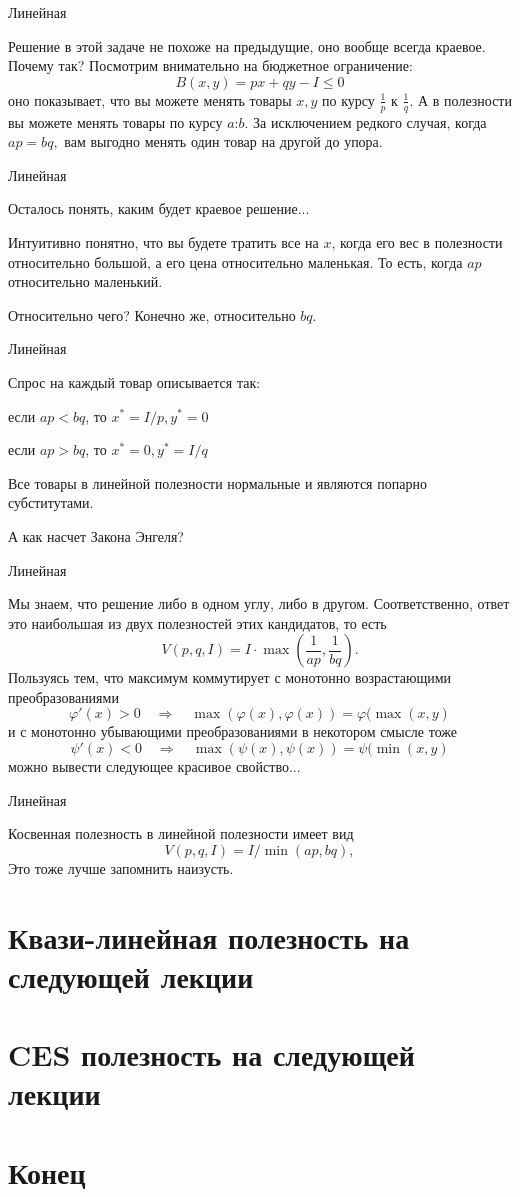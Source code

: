 \documentclass{beamer}
\begin{document}
\begin{frame}{Линейная}

Решение в этой задаче не похоже на предыдущие, оно вообще всегда краевое. 
Почему так? Посмотрим внимательно на бюджетное ограничение:
$$B(x,y) = px + qy - I \leqslant 0$$ 
оно показывает, что вы можете менять товары $x, y$ по курсу $\frac{1}{p}$ к $\frac{1}{q}$. А в полезности вы можете менять товары по курсу $a$:$b$. За исключением редкого случая, когда $ap = bq,$ вам выгодно менять один товар на другой до упора.
\end{frame}

\begin{frame}{Линейная}

Осталось понять, каким будет краевое решение...

Интуитивно понятно, что вы будете тратить все на $x$, когда его вес в полезности относительно большой, а его цена относительно маленькая. То есть, когда $ap$ относительно маленький. 

Относительно чего? Конечно же, относительно $bq$.

\end{frame}

\begin{frame}{Линейная}

Спрос на каждый товар описывается так: 

если $ap < bq$, то $x^{\ast} = I/p, y^{\ast} = 0$

если $ap > bq$, то $x^{\ast} = 0, y^{\ast} = I/q$

Все товары в линейной полезности нормальные и являются попарно субститутами.

А как насчет Закона Энгеля?

\end{frame}

\begin{frame}{Линейная}

Мы знаем, что решение либо в одном углу, либо в другом. Соответственно, ответ это наибольшая из двух полезностей этих кандидатов, то есть
$$V(p,q,I) = I \cdot \max(\frac{1}{ap}, \frac{1}{bq}).$$
Пользуясь тем, что максимум коммутирует с монотонно возрастающими преобразованиями
$$ \varphi'(x) >0 \quad \Rightarrow \quad \max(\varphi(x), \varphi(x)) = \varphi(\max(x, y)$$
и с монотонно убывающими преобразованиями в некотором смысле тоже
$$ \psi'(x) < 0 \quad \Rightarrow \quad \max(\psi(x), \psi(x)) = \psi(\min(x, y)$$
можно вывести следующее красивое свойство...

\end{frame}

\begin{frame}{Линейная}

Косвенная полезность в линейной полезности имеет вид
$$V(p,q,I) = I / \min(ap, bq),$$
Это тоже лучше запомнить наизусть.
\end{frame}

\section{Квази-линейная полезность на следующей лекции}
\section{CES полезность на следующей лекции}

\section{Конец}
\end{document}
